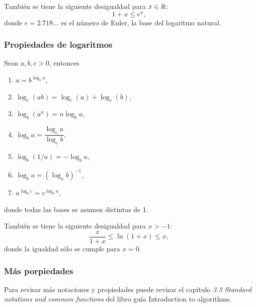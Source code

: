 También se tiene la siguiente desigualdad para $x\in\mathbb{R}$:
\begin{equation*}
    1+x \leq e^x,
\end{equation*}
donde $e=2.718...$ es el número de Euler, la base del logaritmo natural. 


\subsubsection*{Propiedades de logaritmos}
Sean $a,b,c> 0$, entonces
\begin{enumerate}
    \item $a=b^{\log_ba}$,
    \item $\log_c(ab)=\log_c(a) + \log_c(b)$,
    \item $\log_b(a^n) = n\log_b a$,
    \item $\log_ba = \dfrac{\log_ca}{\log_cb}$,
    \item $\log_b(1/a) = -\log_ba$,
    \item $\log_ba = (\log_ab)^{-1}$,
    \item $a^{\log_bc}=c^{\log_ba}$,
\end{enumerate}
donde todas las bases se asumen distintas de 1.

También se tiene la siguiente desigualdad para $x>-1$:
\begin{equation*}
    \dfrac{x}{1+x} \leq \ln(1+x)\leq x,
\end{equation*}
donde la igualdad sólo se cumple para $x=0$.

\subsubsection*{Más porpiedades}
Para revisar más notaciones y propiedades puede revisar el capítulo \textit{3.3 Standard notations and common functions} del libro guía Introduction to algorithms.